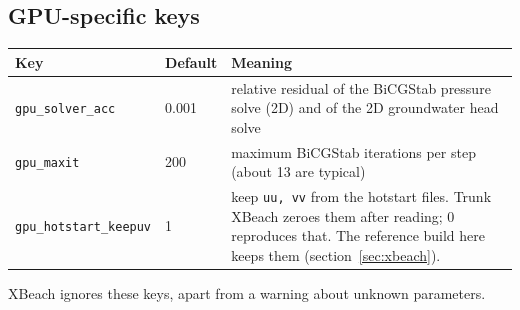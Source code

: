 \documentclass[11pt,a4paper]{article}
\newcommand{\code}[1]{\texttt{#1}}
\begin{document}
\subsection{GPU-specific keys}
\begin{center}\small
\begin{tabularx}{\textwidth}{llX}
\toprule
Key & Default & Meaning \\
\midrule
\code{gpu\_solver\_acc} & 0.001 & relative residual of the BiCGStab pressure solve (2D) and of the 2D groundwater head solve \\
\code{gpu\_maxit} & 200 & maximum BiCGStab iterations per step (about 13 are typical) \\
\code{gpu\_hotstart\_keepuv} & 1 & keep \code{uu, vv} from the hotstart files. Trunk XBeach zeroes them after reading; 0 reproduces that. The reference build here keeps them (section~\ref{sec:xbeach}). \\
\bottomrule
\end{tabularx}
\end{center}
XBeach ignores these keys, apart from a warning about unknown parameters.
\end{document}
